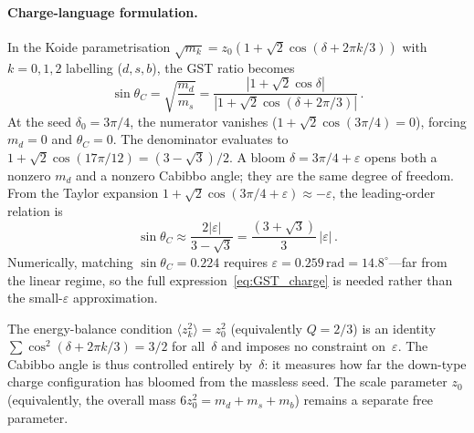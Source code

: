 \paragraph{Charge-language formulation.}
In the Koide parametrisation $\sqrt{m_k} = z_0(1 + \sqrt{2}\cos(\delta + 2\pi k/3))$
with $k = 0,1,2$ labelling ($d, s, b$), the GST ratio becomes
\begin{equation}\label{eq:GST_charge}
\sin\theta_C = \sqrt{\frac{m_d}{m_s}}
= \frac{|1 + \sqrt{2}\cos\delta|}
       {|1 + \sqrt{2}\cos(\delta + 2\pi/3)|}\,.
\end{equation}
At the seed $\delta_0 = 3\pi/4$, the numerator vanishes
($1 + \sqrt{2}\cos(3\pi/4) = 0$), forcing $m_d = 0$ and
$\theta_C = 0$.  The denominator evaluates to
$1 + \sqrt{2}\cos(17\pi/12) = (3 - \sqrt{3})/2$.
A bloom $\delta = 3\pi/4 + \varepsilon$ opens both a nonzero
$m_d$ and a nonzero Cabibbo angle; they are the same degree
of freedom.  From the Taylor expansion
$1 + \sqrt{2}\cos(3\pi/4 + \varepsilon) \approx -\varepsilon$,
the leading-order relation is
$$
\sin\theta_C \approx \frac{2|\varepsilon|}{3 - \sqrt{3}}
= \frac{(3+\sqrt{3})}{3}\,|\varepsilon|\,.
$$
Numerically, matching $\sin\theta_C = 0.224$ requires
$\varepsilon = 0.259\,\text{rad} = 14.8^\circ$---far from the
linear regime, so the full expression~\eqref{eq:GST_charge}
is needed rather than the small-$\varepsilon$ approximation.

The energy-balance condition $\langle z_k^2\rangle = z_0^2$
(equivalently $Q = 2/3$) is an identity
$\sum \cos^2(\delta + 2\pi k/3) = 3/2$ for all~$\delta$ and
imposes no constraint on~$\varepsilon$.  The Cabibbo angle
is thus controlled entirely by~$\delta$: it measures how far
the down-type charge configuration has bloomed from the massless
seed.  The scale parameter $z_0$ (equivalently, the overall mass
$6z_0^2 = m_d + m_s + m_b$) remains a separate free parameter.
